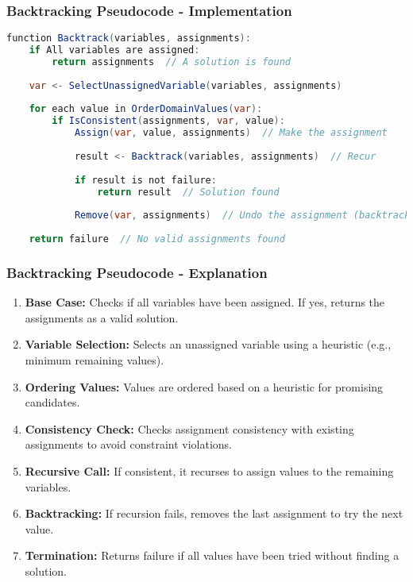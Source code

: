 \documentclass[aspectratio=169]{beamer}
\begin{document}
\begin{frame}[fragile]
    \frametitle{Backtracking Pseudocode - Implementation}
    \begin{lstlisting}[language=Java, basicstyle=\small\ttfamily]
function Backtrack(variables, assignments):
    if All variables are assigned:
        return assignments  // A solution is found
    
    var <- SelectUnassignedVariable(variables, assignments)
    
    for each value in OrderDomainValues(var):
        if IsConsistent(assignments, var, value):
            Assign(var, value, assignments)  // Make the assignment
            
            result <- Backtrack(variables, assignments)  // Recur
            
            if result is not failure:
                return result  // Solution found
            
            Remove(var, assignments)  // Undo the assignment (backtrack)
    
    return failure  // No valid assignments found
    \end{lstlisting}
\end{frame}

\begin{frame}[fragile]
    \frametitle{Backtracking Pseudocode - Explanation}
    \begin{enumerate}
        \item \textbf{Base Case:} Checks if all variables have been assigned. If yes, returns the assignments as a valid solution.
        \item \textbf{Variable Selection:} Selects an unassigned variable using a heuristic (e.g., minimum remaining values).
        \item \textbf{Ordering Values:} Values are ordered based on a heuristic for promising candidates.
        \item \textbf{Consistency Check:} Checks assignment consistency with existing assignments to avoid constraint violations.
        \item \textbf{Recursive Call:} If consistent, it recurses to assign values to the remaining variables.
        \item \textbf{Backtracking:} If recursion fails, removes the last assignment to try the next value.
        \item \textbf{Termination:} Returns failure if all values have been tried without finding a solution.
    \end{enumerate}
\end{frame}
\end{document}
